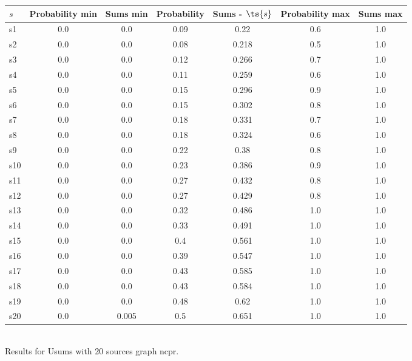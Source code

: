 \documentclass{article}
\begin{document}
\noindent\begin{tabular}{|l|c|c|c|c|c|c|}
\hline
$s$& Probability min & Sums min & Probability & Sums - $\ts{s}$ & Probability max & Sums max\\
\hline
s1 &0.0 & 0.0 & 0.09 & 0.22 & 0.6 & 1.0\\
\hline
s2 &0.0 & 0.0 & 0.08 & 0.218 & 0.5 & 1.0\\
\hline
s3 &0.0 & 0.0 & 0.12 & 0.266 & 0.7 & 1.0\\
\hline
s4 &0.0 & 0.0 & 0.11 & 0.259 & 0.6 & 1.0\\
\hline
s5 &0.0 & 0.0 & 0.15 & 0.296 & 0.9 & 1.0\\
\hline
s6 &0.0 & 0.0 & 0.15 & 0.302 & 0.8 & 1.0\\
\hline
s7 &0.0 & 0.0 & 0.18 & 0.331 & 0.7 & 1.0\\
\hline
s8 &0.0 & 0.0 & 0.18 & 0.324 & 0.6 & 1.0\\
\hline
s9 &0.0 & 0.0 & 0.22 & 0.38 & 0.8 & 1.0\\
\hline
s10 &0.0 & 0.0 & 0.23 & 0.386 & 0.9 & 1.0\\
\hline
s11 &0.0 & 0.0 & 0.27 & 0.432 & 0.8 & 1.0\\
\hline
s12 &0.0 & 0.0 & 0.27 & 0.429 & 0.8 & 1.0\\
\hline
s13 &0.0 & 0.0 & 0.32 & 0.486 & 1.0 & 1.0\\
\hline
s14 &0.0 & 0.0 & 0.33 & 0.491 & 1.0 & 1.0\\
\hline
s15 &0.0 & 0.0 & 0.4 & 0.561 & 1.0 & 1.0\\
\hline
s16 &0.0 & 0.0 & 0.39 & 0.547 & 1.0 & 1.0\\
\hline
s17 &0.0 & 0.0 & 0.43 & 0.585 & 1.0 & 1.0\\
\hline
s18 &0.0 & 0.0 & 0.43 & 0.584 & 1.0 & 1.0\\
\hline
s19 &0.0 & 0.0 & 0.48 & 0.62 & 1.0 & 1.0\\
\hline
s20 &0.0 & 0.005 & 0.5 & 0.651 & 1.0 & 1.0\\
\hline
\end{tabular}\\

\noindent Results for Usums with 20 sources graph ncpr.
\end{document}
